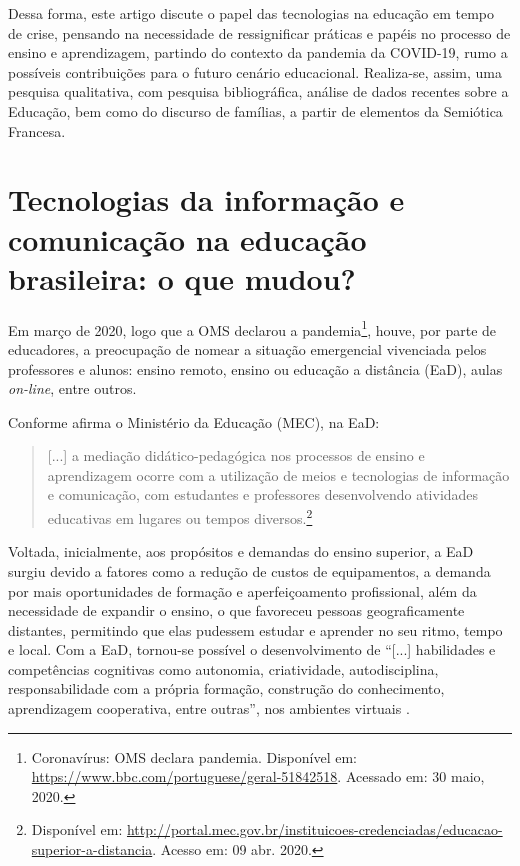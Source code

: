 \documentclass{textolivre}
\begin{document}
Dessa forma, este artigo discute o papel das tecnologias na educação em tempo de crise, pensando na necessidade de ressignificar práticas e papéis no processo de ensino e aprendizagem, partindo do contexto da pandemia da COVID-19, rumo a possíveis contribuições para o futuro cenário educacional. Realiza-se, assim, uma pesquisa qualitativa, com pesquisa bibliográfica, análise de dados recentes sobre a Educação, bem como do discurso de famílias, a partir de elementos da Semiótica Francesa. 

\section{Tecnologias da informação e comunicação na educação brasileira: o que mudou?}\label{sec-tecnologias}
Em março de 2020, logo que a OMS declarou a pandemia\footnote{Coronavírus: OMS declara pandemia. Disponível em: \url{https://www.bbc.com/portuguese/geral-51842518}. Acessado em: 30 maio, 2020.}, houve, por parte de educadores, a preocupação de nomear a situação emergencial vivenciada pelos professores e alunos: ensino remoto, ensino ou educação a distância (EaD), aulas \textit{on-line}, entre outros.

Conforme afirma o Ministério da Educação (MEC), na EaD:

\begin{quote}
    [...] a mediação didático-pedagógica nos processos de ensino e aprendizagem ocorre com a utilização de meios e tecnologias de informação e comunicação, com estudantes e professores desenvolvendo atividades educativas em lugares ou tempos diversos.\footnote{Disponível em: \url{http://portal.mec.gov.br/instituicoes-credenciadas/educacao-superior-a-distancia}. Acesso em: 09 abr. 2020.}
\end{quote}

Voltada, inicialmente, aos propósitos e demandas do ensino superior, a EaD surgiu devido a fatores como a redução de custos de equipamentos, a demanda por mais oportunidades de formação e aperfeiçoamento profissional, além da necessidade de expandir o ensino, o que favoreceu pessoas geograficamente distantes, permitindo que elas pudessem estudar e aprender no seu ritmo, tempo e local. Com a EaD, tornou-se possível o desenvolvimento de “[...] habilidades e competências cognitivas como autonomia, criatividade, autodisciplina, responsabilidade com a própria formação, construção do conhecimento, aprendizagem cooperativa, entre outras”, nos ambientes virtuais \cite[p. 42-43]{fetterman_os_2012}.
\end{document}
